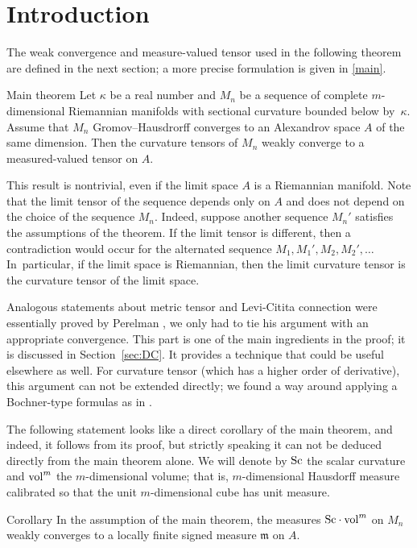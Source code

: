 \section{Introduction}

The weak convergence and measure-valued tensor used in the following theorem are defined in the next section;
a more precise formulation is given in \ref{main}.

\begin{thm}{Main theorem}
Let $\kappa$ be a real number and 
$M_n$ be a sequence of complete $m$-dimensional Riemannian manifolds with sectional curvature bounded below by~$\kappa$.
Assume that $M_n$ Gromov--Hausdrorff converges to an Alexandrov space $A$ of the same dimension.
Then the curvature tensors of $M_n$ weakly converge to a measured-valued tensor on $A$.
\end{thm}

This result is nontrivial, even if the limit space $A$ is a Riemannian manifold.
Note that the limit tensor of the sequence depends only on $A$ and does not depend on the choice of the sequence $M_n$.
Indeed, suppose another sequence $M_n'$ satisfies the assumptions of the theorem.
If the limit tensor is different, 
then a contradiction would occur for the alternated sequence $M_1,M_1',M_2,M_2',\dots$ 
In~particular, if the limit space is Riemannian, then the limit curvature tensor is the curvature tensor of the limit space.

Analogous statements about metric tensor and Levi-Citita connection were essentially proved by Perelman \cite{PerDC},
we only had to tie his argument with an appropriate convergence.
This part is one of the main ingredients in the proof;
it is discussed in Section~\ref{sec:DC}. 
It provides a technique that could be useful elsewhere as well.
For curvature tensor (which has a higher order of derivative), this argument can not be extended directly;
we found a way around applying a Bochner-type formulas as in \cite{petrunin-SC}.

The following statement looks like a direct corollary of the main theorem, 
and indeed, it follows from its proof, but strictly speaking it can not be deduced directly from the main theorem alone.
We will denote by $\operatorname{\rm Sc}$ the scalar curvature and $\operatorname{vol}^m$ the $m$-dimensional volume; that is, $m$-dimensional Hausdorff measure calibrated so that the unit $m$-dimensional cube has unit measure.

\begin{thm}{Corollary}\label{cor:Sc}
In the assumption of the main theorem,
the measures $\Sc\cdot \vol^m$ on $M_n$ weakly converges to a locally finite signed measure $\mathfrak m$  on $A$.
\end{thm}

